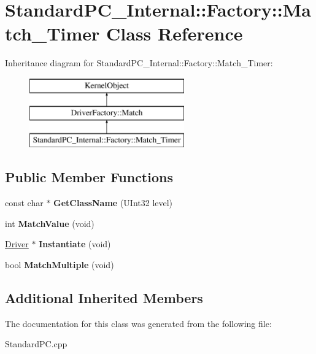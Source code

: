 \hypertarget{class_standard_p_c___internal_1_1_factory_1_1_match___timer}{}\section{Standard\+P\+C\+\_\+\+Internal\+:\+:Factory\+:\+:Match\+\_\+\+Timer Class Reference}
\label{class_standard_p_c___internal_1_1_factory_1_1_match___timer}
Inheritance diagram for Standard\+P\+C\+\_\+\+Internal\+:\+:Factory\+:\+:Match\+\_\+\+Timer\+:\begin{figure}[H]
\begin{center}
\leavevmode
\includegraphics[height=3.000000cm]{class_standard_p_c___internal_1_1_factory_1_1_match___timer}
\end{center}
\end{figure}
\subsection*{Public Member Functions}
\begin{DoxyCompactItemize}
\item 
\mbox{\label{class_standard_p_c___internal_1_1_factory_1_1_match___timer_a5ad877344d92c17167ffab5143e0722a}} 
const char $\ast$ {\bfseries Get\+Class\+Name} (U\+Int32 level)
\item 
\mbox{\label{class_standard_p_c___internal_1_1_factory_1_1_match___timer_aabe43d1cddd99292fa2dea30abf6ebb1}} 
int {\bfseries Match\+Value} (void)
\item 
\mbox{\label{class_standard_p_c___internal_1_1_factory_1_1_match___timer_acd2664893e453943c5a0a03d3367ffda}} 
\hyperlink{class_driver}{Driver} $\ast$ {\bfseries Instantiate} (void)
\item 
\mbox{\label{class_standard_p_c___internal_1_1_factory_1_1_match___timer_a87d1d20cdda475c0b7c3a6afbcc80c42}} 
bool {\bfseries Match\+Multiple} (void)
\end{DoxyCompactItemize}
\subsection*{Additional Inherited Members}


The documentation for this class was generated from the following file\+:\begin{DoxyCompactItemize}
\item 
Standard\+P\+C.\+cpp\end{DoxyCompactItemize}
